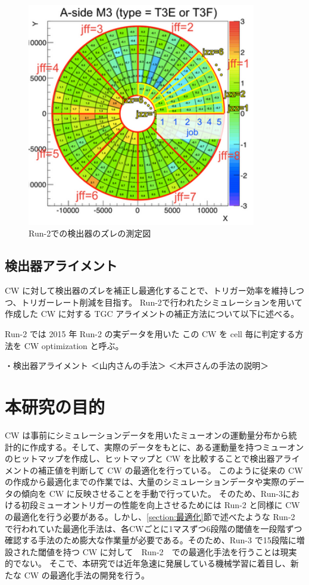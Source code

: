 \begin{figure}[tb]
  \centering
  \includegraphics[clip, width=10cm]{fig/4/zure.png}
  \caption{Run-2での検出器のズレの測定図}
  \label{fig:ズレ}
\end{figure}


\subsection{検出器アライメント}
CW に対して検出器のズレを補正し最適化することで、トリガー効率を維持しつつ、トリガーレート削減を目指す。
Run-2で行われたシミュレーションを用いて作成した CW に対する TGC アライメントの補正方法について以下に述べる。


Run-2 では
2015 年 Run-2 の実データを用いた
この CW を cell 毎に判定する方法を CW optimization と呼ぶ。


・検出器アライメント
＜山内さんの手法＞
＜木戸さんの手法の説明＞


\section{本研究の目的}
CW は事前にシミュレーションデータを用いたミューオンの運動量分布から統計的に作成する。そして、実際のデータをもとに、ある運動量を持つミューオンのヒットマップを作成し、ヒットマップと CW を比較することで検出器アライメントの補正値を判断して CW の最適化を行っている。
このように従来の CW の作成から最適化までの作業では、大量のシミュレーションデータや実際のデータの傾向を CW に反映させることを手動で行っていた。
そのため、Run-3における初段ミューオントリガーの性能を向上させるためには Run-2 と同様に CW の最適化を行う必要がある。しかし、\ref{section:最適化}節で述べたような Run-2 で行われていた最適化手法は、各CWごとに1マスずつ6段階の閾値を一段階ずつ確認する手法のため膨大な作業量が必要である。そのため、Run-3 で15段階に増設された閾値を持つ CW に対して　Run-2　での最適化手法を行うことは現実的でない。
そこで、本研究では近年急速に発展している機械学習に着目し、新たな CW の最適化手法の開発を行う。















